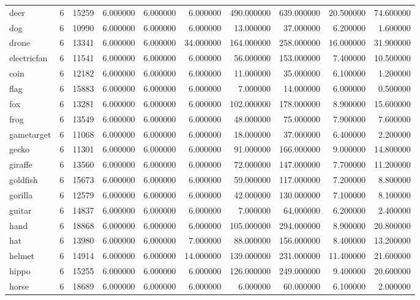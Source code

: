 \begin{tabular}{lrrrrrrrrr}
deer & 6 & 15259 & 6.000000 & 6.000000 & 6.000000 & 490.000000 & 639.000000 & 20.500000 & 74.600000 \\
dog & 6 & 10990 & 6.000000 & 6.000000 & 6.000000 & 13.000000 & 37.000000 & 6.200000 & 1.600000 \\
drone & 6 & 13341 & 6.000000 & 6.000000 & 34.000000 & 164.000000 & 258.000000 & 16.000000 & 31.900000 \\
electricfan & 6 & 11541 & 6.000000 & 6.000000 & 6.000000 & 56.000000 & 153.000000 & 7.400000 & 10.500000 \\
coin & 6 & 12182 & 6.000000 & 6.000000 & 6.000000 & 11.000000 & 35.000000 & 6.100000 & 1.200000 \\
flag & 6 & 15883 & 6.000000 & 6.000000 & 6.000000 & 7.000000 & 14.000000 & 6.000000 & 0.500000 \\
fox & 6 & 13281 & 6.000000 & 6.000000 & 6.000000 & 102.000000 & 178.000000 & 8.900000 & 15.600000 \\
frog & 6 & 13549 & 6.000000 & 6.000000 & 6.000000 & 48.000000 & 75.000000 & 7.900000 & 7.600000 \\
gametarget & 6 & 11068 & 6.000000 & 6.000000 & 6.000000 & 18.000000 & 37.000000 & 6.400000 & 2.200000 \\
gecko & 6 & 11301 & 6.000000 & 6.000000 & 6.000000 & 91.000000 & 166.000000 & 9.000000 & 14.800000 \\
giraffe & 6 & 13560 & 6.000000 & 6.000000 & 6.000000 & 72.000000 & 147.000000 & 7.700000 & 11.200000 \\
goldfish & 6 & 15673 & 6.000000 & 6.000000 & 6.000000 & 59.000000 & 117.000000 & 7.200000 & 8.800000 \\
gorilla & 6 & 12579 & 6.000000 & 6.000000 & 6.000000 & 42.000000 & 130.000000 & 7.100000 & 8.100000 \\
guitar & 6 & 14837 & 6.000000 & 6.000000 & 6.000000 & 7.000000 & 64.000000 & 6.200000 & 2.400000 \\
hand & 6 & 18868 & 6.000000 & 6.000000 & 6.000000 & 105.000000 & 294.000000 & 8.900000 & 20.800000 \\
hat & 6 & 13980 & 6.000000 & 6.000000 & 7.000000 & 88.000000 & 156.000000 & 8.400000 & 13.200000 \\
helmet & 6 & 14914 & 6.000000 & 6.000000 & 14.000000 & 139.000000 & 231.000000 & 11.400000 & 21.600000 \\
hippo & 6 & 15255 & 6.000000 & 6.000000 & 6.000000 & 126.000000 & 249.000000 & 9.400000 & 20.600000 \\
horse & 6 & 18689 & 6.000000 & 6.000000 & 6.000000 & 6.000000 & 60.000000 & 6.100000 & 2.000000 \\

\end{tabular}
